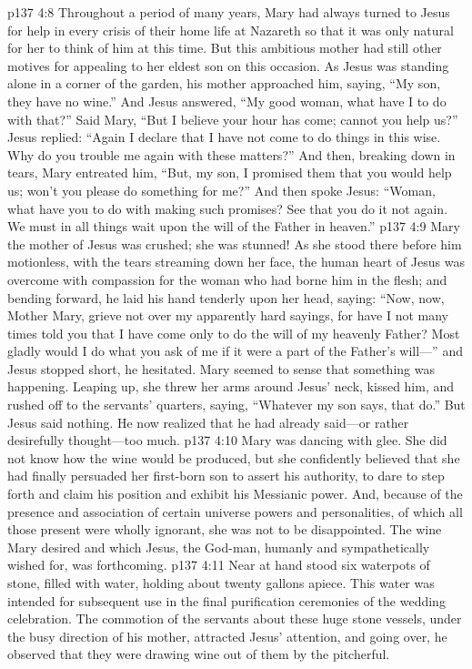 \vs p137 4:8 Throughout a period of many years, Mary had always turned to Jesus for help in every crisis of their home life at Nazareth so that it was only natural for her to think of him at this time. But this ambitious mother had still other motives for appealing to her eldest son on this occasion. As Jesus was standing alone in a corner of the garden, his mother approached him, saying, “My son, they have no wine.” And Jesus answered, \textcolor{ubdarkred}{“My good woman, what have I to do with that?”} Said Mary, “But I believe your hour has come; cannot you help us?” Jesus replied: \textcolor{ubdarkred}{“Again I declare that I have not come to do things in this wise. Why do you trouble me again with these matters?”} And then, breaking down in tears, Mary entreated him, “But, my son, I promised them that you would help us; won’t you please do something for me?” And then spoke Jesus: \textcolor{ubdarkred}{“Woman, what have you to do with making such promises? See that you do it not again. We must in all things wait upon the will of the Father in heaven.”}
\vs p137 4:9 Mary the mother of Jesus was crushed; she was stunned! As she stood there before him motionless, with the tears streaming down her face, the human heart of Jesus was overcome with compassion for the woman who had borne him in the flesh; and bending forward, he laid his hand tenderly upon her head, saying: \textcolor{ubdarkred}{“Now, now, Mother Mary, grieve not over my apparently hard sayings, for have I not many times told you that I have come only to do the will of my heavenly Father? Most gladly would I do what you ask of me if it were a part of the Father’s will---”} and Jesus stopped short, he hesitated. Mary seemed to sense that something was happening. Leaping up, she threw her arms around Jesus’ neck, kissed him, and rushed off to the servants’ quarters, saying, “Whatever my son says, that do.” But Jesus said nothing. He now realized that he had already said---or rather desirefully thought---too much.
\vs p137 4:10 Mary was dancing with glee. She did not know how the wine would be produced, but she confidently believed that she had finally persuaded her first\hyp{}born son to assert his authority, to dare to step forth and claim his position and exhibit his Messianic power. And, because of the presence and association of certain universe powers and personalities, of which all those present were wholly ignorant, she was not to be disappointed. The wine Mary desired and which Jesus, the God\hyp{}man, humanly and sympathetically wished for, was forthcoming.
\vs p137 4:11 Near at hand stood six waterpots of stone, filled with water, holding about twenty gallons apiece. This water was intended for subsequent use in the final purification ceremonies of the wedding celebration. The commotion of the servants about these huge stone vessels, under the busy direction of his mother, attracted Jesus’ attention, and going over, he observed that they were drawing wine out of them by the pitcherful.
